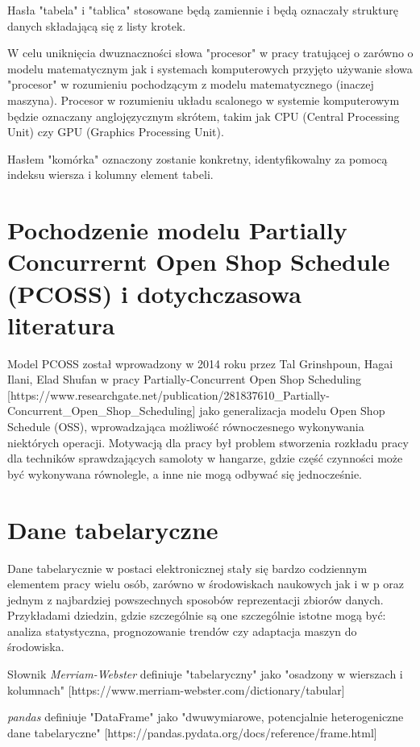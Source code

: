 \documentclass[brudnopis]{xmgr}
\begin{document}
Hasła "tabela" i "tablica" stosowane będą zamiennie i będą oznaczały strukturę danych składającą się z listy krotek. 

W celu uniknięcia dwuznaczności słowa "procesor" w pracy tratującej o zarówno o modelu matematycznym jak i systemach komputerowych przyjęto używanie słowa "procesor" w rozumieniu pochodzącym z modelu matematycznego (inaczej maszyna).
Procesor w rozumieniu układu scalonego w systemie komputerowym będzie oznaczany anglojęzycznym skrótem, takim jak CPU (Central Processing Unit) czy GPU (Graphics Processing Unit).

Hasłem "komórka" oznaczony zostanie konkretny, identyfikowalny za pomocą indeksu wiersza i kolumny element tabeli.

\chapter{Pochodzenie modelu Partially Concurrernt Open Shop Schedule (PCOSS) i dotychczasowa literatura}

Model PCOSS został wprowadzony w 2014 roku przez Tal Grinshpoun, Hagai Ilani, Elad Shufan w pracy Partially-Concurrent Open Shop Scheduling  [https://www.researchgate.net/publication/281837610\_Partially-Concurrent\_Open\_Shop\_Scheduling]
jako generalizacja modelu Open Shop Schedule (OSS), wprowadzająca możliwość równoczesnego wykonywania niektórych operacji. Motywacją dla pracy był problem stworzenia rozkładu pracy dla techników sprawdzających samoloty w hangarze, gdzie część czynności może być wykonywana równolegle, a inne nie mogą odbywać się jednocześnie. 

\chapter{Dane tabelaryczne}

Dane tabelarycznie w postaci elektronicznej stały się bardzo codziennym elementem pracy wielu osób, zarówno w środowiskach naukowych jak i w p oraz jednym z najbardziej powszechnych sposobów reprezentacji zbiorów danych. Przykładami dziedzin, gdzie szczególnie są one szczególnie istotne mogą być: analiza statystyczna, prognozowanie trendów czy adaptacja maszyn do środowiska.

Słownik \emph{Merriam-Webster} definiuje "tabelaryczny" jako "osadzony w wierszach i kolumnach" [https://www.merriam-webster.com/dictionary/tabular]

\emph{pandas} definiuje "DataFrame" jako "dwuwymiarowe, potencjalnie heterogeniczne dane tabelaryczne"
[https://pandas.pydata.org/docs/reference/frame.html]
\end{document}
